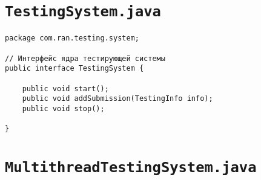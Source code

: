 \section*{\texttt{TestingSystem.java}}
\begin{verbatim}
package com.ran.testing.system;

// Интерфейс ядра тестирующей системы
public interface TestingSystem {
    
    public void start();
    public void addSubmission(TestingInfo info);
    public void stop();
    
}
\end{verbatim}

\section*{\texttt{MultithreadTestingSystem.java}}
